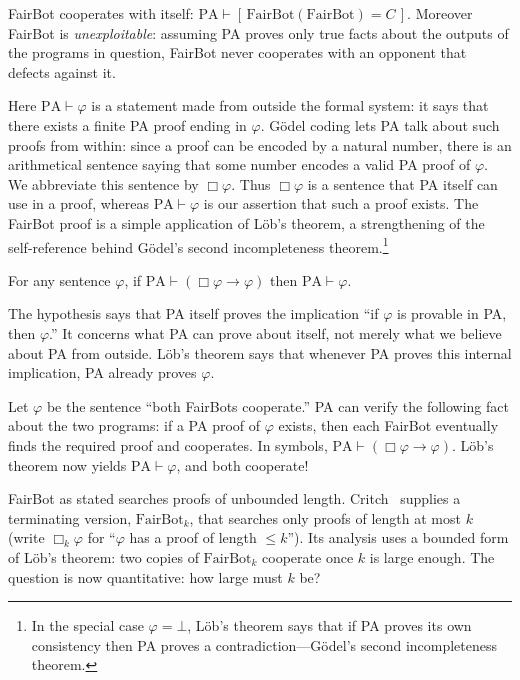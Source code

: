 \begin{theorem*}
FairBot cooperates with itself: $\mathrm{PA} \vdash [\,\mathrm{FairBot}(\mathrm{FairBot}) = C\,]$. Moreover FairBot is \emph{unexploitable}: assuming PA proves only true facts about the outputs of the programs in question, FairBot never cooperates with an opponent that defects against it.
\end{theorem*}

Here $\mathrm{PA}\vdash\varphi$ is a statement made from outside the formal system: it says that there exists a finite PA proof ending in $\varphi$. G\"odel coding lets PA talk about such proofs from within: since a proof can be encoded by a natural number, there is an arithmetical sentence saying that some number encodes a valid PA proof of $\varphi$. We abbreviate this sentence by $\Box\varphi$. Thus $\Box\varphi$ is a sentence that PA itself can use in a proof, whereas $\mathrm{PA}\vdash\varphi$ is our assertion that such a proof exists. The FairBot proof is a simple application of L\"ob's theorem, a strengthening of the self-reference behind G\"odel's second incompleteness theorem.\footnote{In the special case $\varphi=\bot$, L\"ob's theorem says that if PA proves its own consistency then PA proves a contradiction---G\"odel's second incompleteness theorem.}

\begin{theorem*}
For any sentence $\varphi$, if $\mathrm{PA} \vdash (\Box \varphi \to \varphi)$ then $\mathrm{PA} \vdash \varphi$.
\end{theorem*}

The hypothesis says that PA itself proves the implication ``if $\varphi$ is provable in PA, then $\varphi$.'' It concerns what PA can prove about itself, not merely what we believe about PA from outside. L\"ob's theorem says that whenever PA proves this internal implication, PA already proves $\varphi$.

Let $\varphi$ be the sentence ``both FairBots cooperate.'' PA can verify the following fact about the two programs: if a PA proof of $\varphi$ exists, then each FairBot eventually finds the required proof and cooperates. In symbols, $\mathrm{PA} \vdash (\Box\varphi \to \varphi)$. L\"ob's theorem now yields $\mathrm{PA} \vdash \varphi$, and both cooperate!

FairBot as stated searches proofs of unbounded length. Critch~\cite{critch2016} supplies a terminating version, $\mathrm{FairBot}_k$, that searches only proofs of length at most $k$ (write $\Box_k\varphi$ for ``$\varphi$ has a proof of length $\le k$''). Its analysis uses a bounded form of L\"ob's theorem: two copies of $\mathrm{FairBot}_k$ cooperate once $k$ is large enough. The question is now quantitative: how large must $k$ be?

